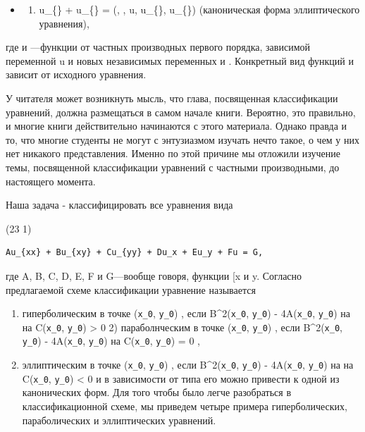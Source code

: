 \documentclass[
  ukrainian,
]{article}
\providecommand{\tightlist}{%
  \setlength{\itemsep}{0pt}\setlength{\parskip}{0pt}}
\begin{document}
\begin{itemize}
  \begin{itemize}
  \tightlist
  \item
    \begin{enumerate}
    \def\labelenumi{\arabic{enumi}.}
    \setcounter{enumi}{2}
    \tightlist
    \item
      u\_\{\xi\xi\} + u\_\{\eta\eta\} = \Phi(\xi, \eta, u, u\_\{\xi\},
      u\_\{\eta\}) (каноническая форма эллиптического уравнения),
    \end{enumerate}
  \end{itemize}

  где \Phi   и \Psi  ---функции от частных производных первого порядка,
  зависимой переменной u и новых независимых переменных \xi   и \eta  .
  Конкретный вид функций \Phi   и \Psi   зависит от исходного уравнения.
\end{itemize}

У читателя может возникнуть мысль, что глава, посвященная классификации
уравнений, должна размещаться в самом начале книги. Вероятно, это
правильно, и многие книги действительно начинаются с этого материала.
Однако правда и то, что многие студенты не могут с энтузиазмом изучать
нечто такое, о чем у них нет никакого представления. Именно по этой
причине мы отложили изучение темы, посвященной классификации уравнений с
частными производными, до настоящего момента.

Наша задача - классифицировать все уравнения вида

(23 1)

\begin{verbatim}
Au_{xx} + Bu_{xy} + Cu_{yy} + Du_x + Eu_y + Fu = G,
\end{verbatim}

где A, B, C, D, E, F и G---вообще говоря, функции {[}x и y. Согласно
предлагаемой схеме классификации уравнение называется

\begin{enumerate}
\def\labelenumi{\arabic{enumi})}
\item
  гиперболическим в точке (\texttt{x\_0}, \texttt{y\_0}) , если
  B\^{}2(\texttt{x\_0}, \texttt{y\_0}) - 4A(\texttt{x\_0},
  \texttt{y\_0})  на  на C(\texttt{x\_0},
  \texttt{y\_0}) \textgreater{} 0 2) параболнческим в точке
  (\texttt{x\_0}, \texttt{y\_0}) , если B\^{}2(\texttt{x\_0},
  \texttt{y\_0}) - 4A(\texttt{x\_0}, \texttt{y\_0})  на
  C(\texttt{x\_0}, \texttt{y\_0}) = 0 ,
\item
  эллиптическим в точке (\texttt{x\_0}, \texttt{y\_0}) , если
  B\^{}2(\texttt{x\_0}, \texttt{y\_0}) - 4A(\texttt{x\_0},
  \texttt{y\_0})  на  на C(\texttt{x\_0},
  \texttt{y\_0}) \textless{} 0 и в зависимости от типа его можно
  привести к одной из канонических форм. Для того чтобы было легче
  разобраться в классификационной схеме, мы приведем четыре примера
  гиперболических, параболических и эллиптических уравнений.
\end{enumerate}
\end{document}
